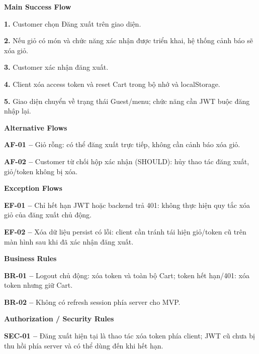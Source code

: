\documentclass[11pt,a4paper,oneside]{report}
\begin{document}
\par\smallskip\noindent\textcolor{sgublue}{\textbf{Main Success Flow}}\par\nobreak
\textbf{1.} Customer chọn Đăng xuất trên giao diện.

\textbf{2.} Nếu giỏ có món và chức năng xác nhận được triển khai, hệ thống cảnh báo sẽ xóa giỏ.

\textbf{3.} Customer xác nhận đăng xuất.

\textbf{4.} Client xóa access token và reset Cart trong bộ nhớ và localStorage.

\textbf{5.} Giao diện chuyển về trạng thái Guest/menu; chức năng cần JWT buộc đăng nhập lại.
\par

\par\smallskip\noindent\textcolor{sgublue}{\textbf{Alternative Flows}}\par\nobreak
\textbf{AF-01 --} Giỏ rỗng: có thể đăng xuất trực tiếp, không cần cảnh báo xóa giỏ.

\textbf{AF-02 --} Customer từ chối hộp xác nhận (SHOULD): hủy thao tác đăng xuất, giỏ/token không bị xóa.
\par

\par\smallskip\noindent\textcolor{sgublue}{\textbf{Exception Flows}}\par\nobreak
\textbf{EF-01 --} Chỉ hết hạn JWT hoặc backend trả 401: không thực hiện quy tắc xóa giỏ của đăng xuất chủ động.

\textbf{EF-02 --} Xóa dữ liệu persist có lỗi: client cần tránh tái hiện giỏ/token cũ trên màn hình sau khi đã xác nhận đăng xuất.
\par

\par\smallskip\noindent\textcolor{sgublue}{\textbf{Business Rules}}\par\nobreak
\textbf{BR-01 --} Logout chủ động: xóa token và toàn bộ Cart; token hết hạn/401: xóa token nhưng giữ Cart.

\textbf{BR-02 --} Không có refresh session phía server cho MVP.
\par

\par\smallskip\noindent\textcolor{sgublue}{\textbf{Authorization / Security Rules}}\par\nobreak
\textbf{SEC-01 --} Đăng xuất hiện tại là thao tác xóa token phía client; JWT cũ chưa bị thu hồi phía server và có thể dùng đến khi hết hạn.
\end{document}
